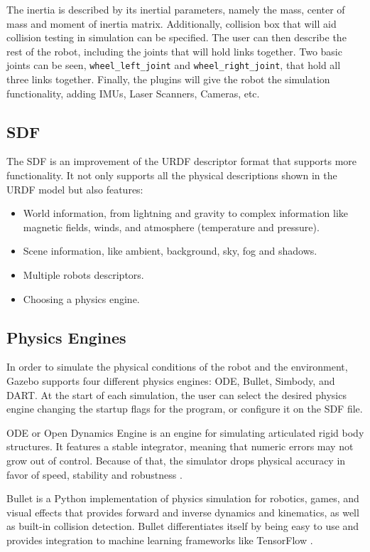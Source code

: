 The inertia is described by its inertial parameters, namely the mass, center of mass and moment of inertia matrix. Additionally, collision box that will aid collision testing in simulation can be specified. The user can then describe the rest of the robot, including the joints that will hold links together. Two basic joints can be seen, \texttt{wheel\_left\_joint} and \texttt{wheel\_right\_joint}, that hold all three links together. Finally, the plugins will give the robot the simulation functionality, adding IMUs, Laser Scanners, Cameras, etc.

\subsection{SDF}

The SDF is an improvement of the URDF descriptor format that supports more functionality. It not only supports all the physical descriptions shown in the URDF model but also features:

\begin{itemize}
\item World information, from lightning and gravity to complex information like magnetic fields, winds, and atmosphere (temperature and pressure).
\item Scene information, like ambient, background, sky, fog and shadows.
\item Multiple robots descriptors.
\item Choosing a physics engine.
\end{itemize}

\subsection{Physics Engines}

In order to simulate the physical conditions of the robot and the environment, Gazebo supports four different physics engines: ODE, Bullet, Simbody, and DART. At the start of each simulation, the user can select the desired physics engine changing the startup flags for the program, or configure it on the SDF file.

ODE or Open Dynamics Engine is an engine for simulating articulated rigid body structures. It features a stable integrator, meaning that numeric errors may not grow out of control. Because of that, the simulator drops physical accuracy in favor of speed, stability and robustness \cite{smith2005open}.

Bullet is a Python implementation of physics simulation for robotics, games, and visual effects that provides forward and inverse dynamics and kinematics, as well as built-in collision detection. Bullet differentiates itself by being easy to use and provides integration to machine learning frameworks like TensorFlow \cite{coumans2018}.

